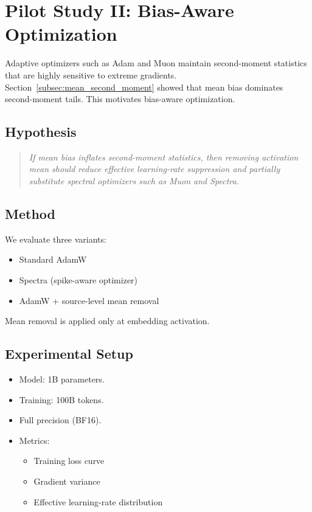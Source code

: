 \section{Pilot Study II: Bias-Aware Optimization}
\label{sec:optimizer_pilot}

Adaptive optimizers such as Adam and Muon maintain
second-moment statistics that are highly sensitive to extreme gradients.
Section~\ref{subsec:mean_second_moment} showed that
mean bias dominates second-moment tails.
This motivates bias-aware optimization.

\subsection{Hypothesis}

\begin{quote}
\emph{If mean bias inflates second-moment statistics,
then removing activation mean should reduce effective learning-rate suppression
and partially substitute spectral optimizers such as Muon and Spectra.}
\end{quote}

\subsection{Method}

We evaluate three variants:

\begin{itemize}
\item Standard AdamW
\item Spectra (spike-aware optimizer)
\item AdamW + source-level mean removal
\end{itemize}

Mean removal is applied only at embedding activation.

\subsection{Experimental Setup}

\begin{itemize}
\item Model: 1B parameters.
\item Training: 100B tokens.
\item Full precision (BF16).
\item Metrics:
  \begin{itemize}
  \item Training loss curve
  \item Gradient variance
  \item Effective learning-rate distribution
  \end{itemize}
\end{itemize}

